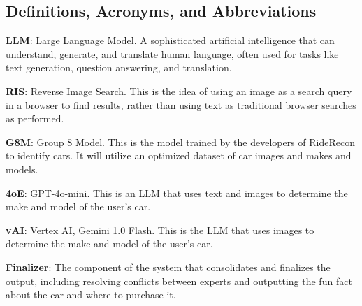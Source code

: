 \documentclass[]{article}
\begin{document}
\subsection{Definitions, Acronyms, and Abbreviations}
\label{sub:definitions_acronyms_and_abbreviations}
\textbf{LLM}: Large Language Model. A sophisticated artificial intelligence that can understand, generate, and translate human language, often used for tasks like text generation, question answering, and translation.

\textbf{RIS}: Reverse Image Search. This is the idea of using an image as a search query in a browser to find results, rather than using text as traditional browser searches as performed.

\textbf{G8M}: Group 8 Model. This is the model trained by the developers of RideRecon to identify cars. It will utilize an optimized dataset of car images and makes and models.

\textbf{4oE}: GPT-4o-mini. This is an LLM that uses text and images to determine the make and model of the user's car.

\textbf{vAI}: Vertex AI, Gemini 1.0 Flash. This is the LLM that uses images to determine the make and model of the user's car.

\textbf{Finalizer}: The component of the system that consolidates and finalizes the output, including resolving conflicts between experts and outputting the fun fact about the car and where to purchase it.
\end{document}

